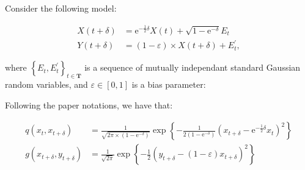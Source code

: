 \documentclass[]{article}
\begin{document}
\hypertarget{section}{%
\section{}\label{section}}

Consider the following model:

\begin{align}
X(t + \delta) &= \text{e}^{-\frac{1}{2} \delta} X(t) + \sqrt{1 - \text{e}^{-\delta}} E_t \\
Y(t + \delta) &= ( 1 - \varepsilon) \times X(t + \delta) + E^{'}_t,
\end{align}

where \(\left\lbrace E_t, E^{'}_t \right\rbrace_{t\in \mathbf{T}}\) is a
sequence of mutually independant standard Gaussian random variables, and
\(\varepsilon \in [0,1]\) is a bias parameter:

Following the paper notations, we have that:

\begin{align*}
q(x_t, x_{t + \delta}) &=\frac{1}{\sqrt{2\pi\times (1 - \text{e}^{-\delta})}}\exp\left\lbrace-\frac{1}{2(1 - \text{e}^{-\delta})} \left( x_{t+\delta} - \text{e}^{-\frac{1}{2} \delta} x_t \right)^2 \right\rbrace\\
g(x_{t + \delta}, y_{t + \delta}) &= \frac{1}{\sqrt{2\pi}} \exp\left\lbrace -\frac{1}{2} \left( y_{t+\delta} - (1 - \varepsilon) x_{t + \delta} \right)^2\right\rbrace
\end{align*}
\end{document}
